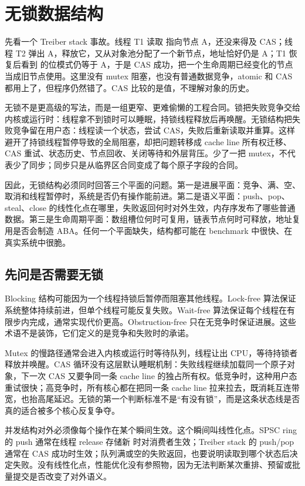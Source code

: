 \chapter{无锁数据结构}

先看一个 Treiber stack 事故。线程 T1 读取  指向节点 A，还没来得及 CAS；线程 T2 弹出 A，释放它，又从对象池分配了一个新节点，地址恰好仍是 A；T1 恢复后看到  的位模式仍等于 A，于是 CAS 成功，把一个生命周期已经变化的节点当成旧节点使用。这里没有 mutex 阻塞，也没有普通数据竞争，atomic 和 CAS 都用上了，但程序仍然错了。CAS 比较的是值，不理解对象的历史。

无锁不是更高级的写法，而是一组更窄、更难偷懒的工程合同。锁把失败竞争交给内核或运行时：线程拿不到锁时可以睡眠，持锁线程释放后再唤醒。无锁结构把失败竞争留在用户态：线程读一个状态，尝试 CAS，失败后重新读取并重算。这样避开了持锁线程暂停导致的全局阻塞，却把问题转移成 cache line 所有权迁移、CAS 重试、状态历史、节点回收、关闭等待和外层背压。少了一把 mutex，不代表少了同步；同步只是从临界区合同变成了每个原子字段的合同。

因此，无锁结构必须同时回答三个平面的问题。第一是进展平面：竞争、满、空、取消和线程暂停时，系统是否仍有操作能前进。第二是语义平面：push、pop、steal、close 的线性化点在哪里，失败返回何时对外生效，内存序发布了哪些普通数据。第三是生命周期平面：数组槽位何时可复用，链表节点何时可释放，地址复用是否会制造 ABA。任何一个平面缺失，结构都可能在 benchmark 中很快、在真实系统中很脆。

\section{先问是否需要无锁}

Blocking 结构可能因为一个线程持锁后暂停而阻塞其他线程。Lock-free 算法保证系统整体持续前进，但单个线程可能反复失败。Wait-free 算法保证每个线程在有限步内完成，通常实现代价更高。Obstruction-free 只在无竞争时保证进展。这些术语不是装饰，它们定义的是竞争和失败时的承诺。

Mutex 的慢路径通常会进入内核或运行时等待队列，线程让出 CPU，等待持锁者释放并唤醒。CAS 循环没有这层默认睡眠机制：失败线程继续加载同一个原子对象，下一次 CAS 又要争同一条 cache line 的独占所有权。低竞争时，这种用户态重试很快；高竞争时，所有核心都在把同一条 cache line 拉来拉去，既消耗互连带宽，也抬高尾延迟。无锁的第一个判断标准不是“有没有锁”，而是这条状态线是否真的适合被多个核心反复争夺。

并发结构对外必须像每个操作在某个瞬间生效。这个瞬间叫线性化点。SPSC ring 的 push 通常在线程 release 存储新  时对消费者生效；Treiber stack 的 push/pop 通常在 CAS 成功时生效；队列满或空的失败返回，也要说明读取到哪个状态后决定失败。没有线性化点，性能优化没有参照物，因为无法判断某次重排、预留或批量提交是否改变了对外语义。

